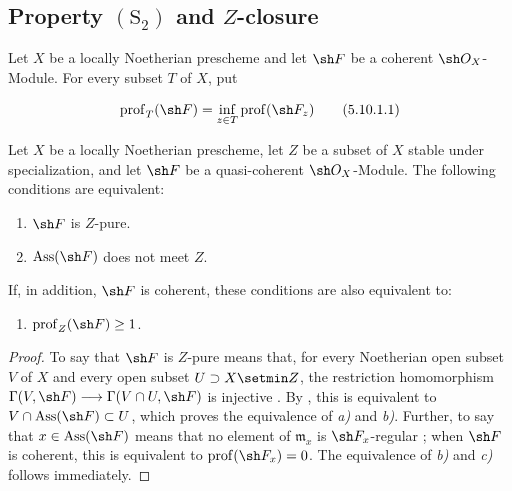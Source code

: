 \subsection{Property \texorpdfstring{$(\mathrm{S}_2)$}{(S2)} and
\texorpdfstring{$Z$}{Z}-closure}
\label{subsection:IV.5.10}

\begin{env}[5.10.1]
\label{IV.5.10.1}
Let $X$ be a locally Noetherian prescheme and let $\sh F$ be a
coherent $\sh O_X$-Module.  For every subset $T$ of $X$, put
\end{env}

\begin{equation}
\label{IV.5.10.1.1}
\operatorname{prof}_T(\sh F)
 =\inf_{z\in T}\operatorname{prof}(\sh F_z)
\tag{5.10.1.1}
\end{equation}

\begin{proposition}[5.10.2]
\label{IV.5.10.2}
Let $X$ be a locally Noetherian prescheme, let $Z$ be a subset of
$X$ stable under specialization, and let $\sh F$ be a
quasi-coherent $\sh O_X$-Module.  The following conditions are
equivalent:
\begin{enumerate}[{\rm a)}]
  \item $\sh F$ is $Z$-pure.
  \item $\operatorname{Ass}(\sh F)$ does not meet $Z$.
\end{enumerate}
If, in addition, $\sh F$ is coherent, these conditions are also
equivalent to:
\begin{enumerate}
  \item[\rm c)] $\operatorname{prof}_Z(\sh F)\geq1$.
\end{enumerate}
\end{proposition}

\begin{proof}
To say that $\sh F$ is $Z$-pure means that, for every Noetherian
open subset $V$ of $X$ and every open subset $U\supset X\setmin Z$, the
restriction homomorphism $\Gamma(V,\sh F)\longrightarrow\Gamma(V\cap U,\sh F)$
is injective .  By , this is
equivalent to
$V\cap\operatorname{Ass}(\sh F)\subset U$, which proves the
equivalence of \emph{a)} and \emph{b)}.  Further, to say that
$x\in\operatorname{Ass}(\sh F)$ means that no element of
$\mathfrak m_x$ is $\sh F_x$-regular ; when
$\sh F$ is coherent, this is equivalent to
$\operatorname{prof}(\sh F_x)=0$.  The equivalence of \emph{b)} and
\emph{c)} follows immediately.
\end{proof}

